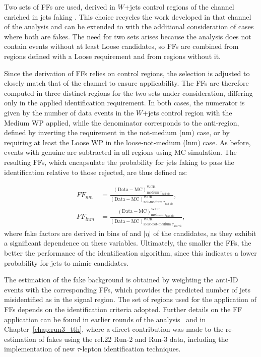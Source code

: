 Two sets of FFs are used, derived in $W$+jets control regions of the \taulephad channel enriched in jets faking \tauhadvis. This choice recycles the work developed in that channel of the \htautau analysis and can be extended to \tauhadhad with the additional consideration of cases where both \tauhadvis are fakes. 
The need for two sets arises because the analysis does not contain events without at least Loose \tauhadvis candidates, so FFs are combined from regions defined with a Loose requirement and from regions without it.  

Since the derivation of FFs relies on \taulephad control regions, the \tauhadvis selection is adjusted to closely match that of the \tauhadhad channel to ensure applicability. The FFs are therefore computed in three distinct regions for the two sets under consideration, differing only in the applied identification requirement. 
In both cases, the numerator is given by the number of data events in the $W$+jets control region with the Medium WP applied, while the denominator corresponds to the anti-\tauhadvis region, defined by inverting the requirement in the not-medium (nm) case, or by requiring at least the Loose WP in the loose-not-medium (lnm) case. 
As before, events with genuine \tauhadvis are subtracted in all regions using MC simulation. 
The resulting FFs, which encapsulate the probability for jets faking \tauhadvis to pass the identification relative to those rejected, are thus defined as:

\begin{align}
    FF_{nm} &= 
    \frac{(\text{Data} - \text{MC})^{\text{WCR}}_{\text{medium } \tau_{\text{had-vis}}}}
         {(\text{Data} - \text{MC})^{\text{WCR}}_{\text{not-medium } \tau_{\text{had-vis}}}}, \nonumber \\[6pt]
    FF_{lnm} &= 
    \frac{(\text{Data} - \text{MC})^{\text{WCR}}_{\text{medium } \tau_{\text{had-vis}}}}
         {(\text{Data} - \text{MC})^{\text{WCR}}_{\text{loose-not-medium } \tau_{\text{had-vis}}}},
\end{align}
where fake factors are derived in bins of \pt and $|\eta|$ of the \tauhadvis candidates, as they exhibit a significant dependence on these variables. 
Ultimately, the smaller the FFs, the better the performance of the \tauhad identification algorithm, since this indicates a lower probability for jets to mimic \tauhadvis candidates.  

The estimation of the fake background is obtained by weighting the \tauhadhad anti-ID events with the corresponding FFs, which provides the predicted number of jets misidentified as \tauhadvis in the signal region. 
The set of regions used for the application of FFs depends on the identification criteria adopted. 
Further details on the FF application can be found in earlier rounds of the \Htautau analysis~\cite{couplings} and in Chapter~\ref{chap:run3_tth}, where a direct contribution was made to the re-estimation of fakes using the rel.22 Run-2 and Run-3 data, including the implementation of new $\tau$-lepton identification techniques.  


